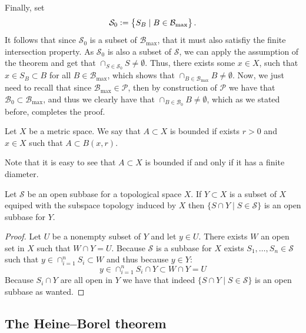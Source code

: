 \documentclass[11pt,a4paper]{article}
\begin{document}
\begin{proofof}{}
  Finally, set
  \[
    \mathcal S_0 := \left\{S_B \mid B \in \mathcal B_{\max}\right\}.
  \]
  It follows that since $\mathcal S_0$ is a subset of $\mathcal B_{\max}$, 
  that it must also satisfiy the finite intersection property.
  As $\mathcal S_0$ is also a subset of $\mathcal S$,
  we can apply the assumption of the theorem and get that
  $\cap_{S \in \mathcal S_0} S \neq \emptyset$.
  Thus, there exists some $x \in X$, such that $x \in S_B \subset B$
  for all $B \in \mathcal B_{\max}$, which shows that
  $\cap_{B \in \mathcal B_{\max}} B \neq \emptyset$.
  Now, we just need to recall that since $\mathcal B_{\max} \in \mathcal P$,
  then by construction of $\mathcal P$ we have that 
  $\mathcal B_0 \subset \mathcal B_{\max}$, and thus we clearly have that
  $\cap_{B \in \mathcal B_0} B \neq \emptyset$, which as we stated before,
  completes the proof.
\end{proofof}

\begin{definition}
  Let $X$ be a metric space. We say that $A \subset X$ is 
  bounded if exists $r > 0$ and $x \in X$ such that $A \subset B(x,r)$.
\end{definition}

Note that it is easy to see that $A \subset X$ is bounded if and only
if it has a finite diameter.

\begin{lemma}
  Let $\mathcal{S}$ be an open subbase for a topological space $X$.
  If $Y \subset X$ is a subset of $X$ equiped with the subspace
  topology induced by $X$ then $\{S \cap Y \mid S \in \mathcal{S}\}$
  is an open subbase for $Y$.
\end{lemma}
\begin{proof}
  Let $U$ be a nonempty subset of $Y$ and let $y \in U$. There
  exists $W$ an open set in $X$ such that $W \cap Y = U$. Because
  $\mathcal{S}$ is a subbase for $X$ exists 
  $S_1,\dots,S_n \in \mathcal{S}$ such that 
  $y \in \cap_{i=1}^{n}{S_i} \subset W$ and thus because $y \in Y$:
  \[
    y \in \cap_{i=1}^{n}{S_i \cap Y} \subset W \cap Y = U
  \]
  Because $S_i \cap Y$ are all open in $Y$ we have that indeed
  $\{S \cap Y \mid S \in \mathcal{S}\}$ is an open subbase as wanted.
\end{proof}

\subsection{The Heine--Borel theorem}
\end{document}
